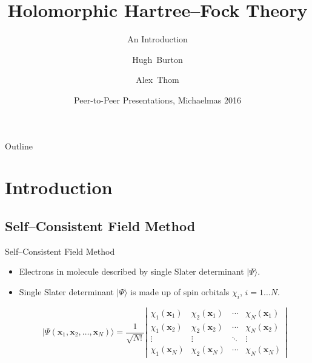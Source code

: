 \documentclass{beamer}
\title[Holomorphic Hartree--Fock Theory]
{%
  Holomorphic Hartree--Fock Theory
}
\subtitle{An Introduction}
\author[Burton, Thom]
{
  \hskip-1.7mm
  Hugh~Burton \and
  Alex~Thom \and
}
\institute[Burton and others]
{
  University of Cambridge
}
\date[P2P 2016]
{Peer-to-Peer Presentations, Michaelmas 2016}
\newcommand{\ket}[1] {{| #1 \rangle}}
\begin{document}
\begin{frame}
  \titlepage
\end{frame}

\begin{frame}{Outline}
  \tableofcontents
\end{frame}


\section{Introduction}

\subsection{Self--Consistent Field Method}

\begin{frame}{Self--Consistent Field Method}
\begin{itemize}
\item<1-> Electrons in molecule described by single Slater determinant $\ket{\Psi}$.

\item<2-> Single Slater determinant $\ket{\Psi}$ is made up of spin orbitals $\chi_i$, $i=1\dots N$.

$$\ket{\Psi(\mathbf{x}_1, \mathbf{x}_2, \ldots, \mathbf{x}_N)} =
\frac{1}{\sqrt{N!}}
\left|
   \begin{matrix} \chi_1(\mathbf{x}_1) & \chi_2(\mathbf{x}_1) & \cdots & \chi_N(\mathbf{x}_1) \\
                      \chi_1(\mathbf{x}_2) & \chi_2(\mathbf{x}_2) & \cdots & \chi_N(\mathbf{x}_2) \\
                      \vdots & \vdots & \ddots & \vdots \\
                      \chi_1(\mathbf{x}_N) & \chi_2(\mathbf{x}_N) & \cdots & \chi_N(\mathbf{x}_N)
   \end{matrix} \right|$$
\end{itemize}
\end{frame}
\end{document}
